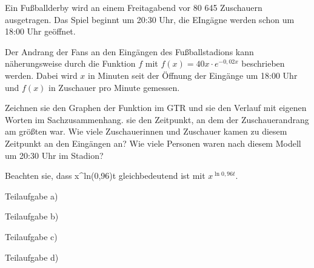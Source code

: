 \documentclass[11pt, a5paper, landscape, final]{scrartcl}
\begin{document}
	\begin{aufgabe}
		Ein Fußballderby wird an einem Freitagabend vor 80 645 Zuschauern ausgetragen. Das Spiel beginnt um 20:30 Uhr, die EIngägne werden schon um 18:00 Uhr geöffnet.
		
		Der Andrang der Fans an den Eingängen des Fußballstadions kann näherungsweise durch die Funktion $f$ mit $f(x) = 40x\cdot e^{-0,02x}$ beschrieben werden. Dabei wird $x$ in Minuten seit der Öffnung der Eingänge um 18:00 Uhr und $f(x)$ in Zuschauer pro Minute gemessen.
		
		\begin{teilaufgaben}
			\teilaufgabe Zeichnen sie den Graphen der Funktion im GTR und  sie den Verlauf mit eigenen Worten im Sachzusammenhang.
			\teilaufgabe {} sie den Zeitpunkt, an dem der Zuschauerandrang am größten war. Wie viele Zuschauerinnen und Zuschauer kamen zu diesem Zeitpunkt an den Eingängen an?
			\teilaufgabe Wie viele Personen waren nach diesem Modell um 20:30 Uhr im Stadion?\\
		\end{teilaufgaben}
	\end{aufgabe}
	\clearpage
	
	\begin{center}
		Beachten sie, dass x\textasciicircum ln(0,96)t gleichbedeutend ist mit $x^{\ln{0,96}t}$.
		\begin{multicols}{4}
			Teilaufgabe a)\\
			\columnbreak
			
			Teilaufgabe b)\\
			\columnbreak
			
			Teilaufgabe c)\\
			\columnbreak
			
			Teilaufgabe d)\\
			\columnbreak
		\end{multicols}
	\end{center}
	\clearpage
	
\end{document}
